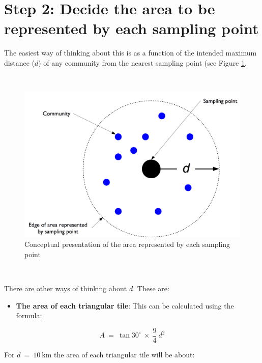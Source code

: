 \documentclass[12pt,a4paper]{book}
\providecommand{\tightlist}{%
  \setlength{\itemsep}{0pt}\setlength{\parskip}{0pt}}
\theoremstyle{definition}
\theoremstyle{definition}
\theoremstyle{definition}
\theoremstyle{remark}
\begin{document}
\newpage

\hypertarget{step-2-decide-the-area-to-be-represented-by-each-sampling-point}{%
\section{Step 2: Decide the area to be represented by each sampling
point}\label{step-2-decide-the-area-to-be-represented-by-each-sampling-point}}

The easiest way of thinking about this is as a function of the intended
maximum distance (\(d\)) of any community from the nearest sampling
point (see Figure \ref{fig:distance}.

~

\begin{figure}[H]

{\centering \includegraphics[width=16.67in]{figures/step2} 

}

\caption{Conceptual presentation of the area represented by each sampling point}\label{fig:distance}
\end{figure}

~

There are other ways of thinking about \(d\). These are:

\begin{itemize}
\tightlist
\item
  \textbf{The area of each triangular tile}: This can be calculated
  using the formula:
\end{itemize}

\[ A ~ = ~ \tan30^ \circ ~ \times ~ \frac{9}{4} ~ d ^ 2 \]

For \(d ~ = ~ 10 ~ \text{km}\) the area of each triangular tile will be
about:
\end{document}

